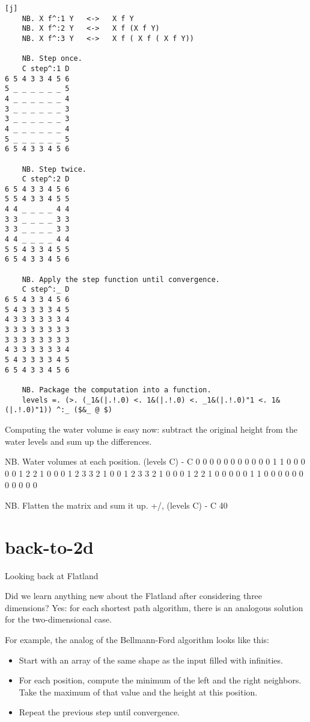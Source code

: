 \documentclass{article}
\begin{document}
\begin{verbatim}[j]
    NB. X f^:1 Y   <->   X f Y
    NB. X f^:2 Y   <->   X f (X f Y)
    NB. X f^:3 Y   <->   X f ( X f ( X f Y))

    NB. Step once.
    C step^:1 D
6 5 4 3 3 4 5 6
5 _ _ _ _ _ _ 5
4 _ _ _ _ _ _ 4
3 _ _ _ _ _ _ 3
3 _ _ _ _ _ _ 3
4 _ _ _ _ _ _ 4
5 _ _ _ _ _ _ 5
6 5 4 3 3 4 5 6

    NB. Step twice.
    C step^:2 D
6 5 4 3 3 4 5 6
5 5 4 3 3 4 5 5
4 4 _ _ _ _ 4 4
3 3 _ _ _ _ 3 3
3 3 _ _ _ _ 3 3
4 4 _ _ _ _ 4 4
5 5 4 3 3 4 5 5
6 5 4 3 3 4 5 6

    NB. Apply the step function until convergence.
    C step^:_ D
6 5 4 3 3 4 5 6
5 4 3 3 3 3 4 5
4 3 3 3 3 3 3 4
3 3 3 3 3 3 3 3
3 3 3 3 3 3 3 3
4 3 3 3 3 3 3 4
5 4 3 3 3 3 4 5
6 5 4 3 3 4 5 6

    NB. Package the computation into a function.
    levels =. (>. (_1&(|.!.0) <. 1&(|.!.0) <. _1&(|.!.0)"1 <. 1&(|.!.0)"1)) ^:_ ($&_ @ $)
\end{verbatim}

Computing the water volume is easy now: subtract the original height from the water levels and sum up the differences.

\begin{code}[j]
    NB. Water volumes at each position.
    (levels C) - C
0 0 0 0 0 0 0 0
0 0 0 1 1 0 0 0
0 0 1 2 2 1 0 0
0 1 2 3 3 2 1 0
0 1 2 3 3 2 1 0
0 0 1 2 2 1 0 0
0 0 0 1 1 0 0 0
0 0 0 0 0 0 0 0

    NB. Flatten the matrix and sum it up.
    +/, (levels C) - C
40
\end{code}

\section{back-to-2d}{Looking back at Flatland}

Did we learn anything new about the Flatland after considering three dimensions?
Yes: for each shortest path algorithm, there is an analogous solution for the two-dimensional case.

For example, the analog of the Bellmann-Ford algorithm looks like this:
\begin{itemize}
  \item Start with an array of the same shape as the input filled with infinities.
  \item 
    For each position, compute the minimum of the left and the right neighbors.
    Take the maximum of that value and the height at this position.
  \item Repeat the previous step until convergence.
\end{itemize}
\end{document}
